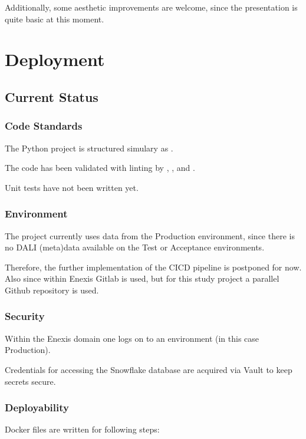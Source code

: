 \documentclass[letterpaper,10pt,english]{sphinxmanual}
\let\sphinxpxdimen\pdfpxdimen\else\newdimen\sphinxpxdimen
\begin{document}
Additionally, some aesthetic improvements are welcome, since the presentation is quite basic at this moment.


\chapter{Deployment}
\label{\detokenize{deployment:deployment}}\label{\detokenize{deployment::doc}}

\section{Current Status}
\label{\detokenize{deployment:current-status}}

\subsection{Code Standards}
\label{\detokenize{deployment:code-standards}}
The Python project is structured simulary as .

The code has been validated with linting by , , and .

Unit tests have not been written yet.


\subsection{Environment}
\label{\detokenize{deployment:environment}}
The project currently uses data from the Production environment, since there is no DALI (meta)data available on the Test or Acceptance environments.

Therefore, the further implementation of the CICD pipeline is postponed for now.
Also since within Enexis Gitlab is used, but for this study project a parallel Github repository is used.


\subsection{Security}
\label{\detokenize{deployment:security}}
Within the Enexis domain one logs on to an environment (in this case Production).

Credentials for accessing the Snowflake database are acquired via Vault to keep secrets secure.


\subsection{Deployability}
\label{\detokenize{deployment:deployability}}
Docker files are written for following steps:
\begin{quote}

\noindent{\hspace*{\fill}\sphinxincludegraphics[width=800\sphinxpxdimen]{{process_triggered}.png}\hspace*{\fill}}
\end{quote}
\end{document}
